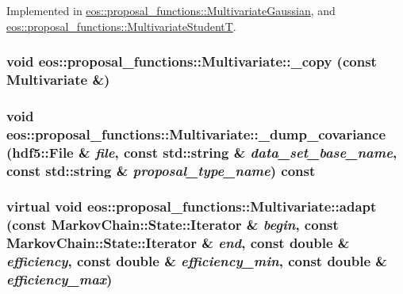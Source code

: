 Implemented in \hyperlink{classeos_1_1proposal__functions_1_1MultivariateGaussian_ac797f04a7bce3b029cfc32af0d6ecd07}{eos::proposal\_\-functions::MultivariateGaussian}, and \hyperlink{classeos_1_1proposal__functions_1_1MultivariateStudentT_aa44fa5958d242f5aae93c0dfa4cb8d84}{eos::proposal\_\-functions::MultivariateStudentT}.\hypertarget{classeos_1_1proposal__functions_1_1Multivariate_a33c4b4ed443dc77bb376636636f11b88}{
\subsubsection[{\_\-copy}]{\setlength{\rightskip}{0pt plus 5cm}void eos::proposal\_\-functions::Multivariate::\_\-copy (const {\bf Multivariate} \&)}}
\label{classeos_1_1proposal__functions_1_1Multivariate_a33c4b4ed443dc77bb376636636f11b88}
\hypertarget{classeos_1_1proposal__functions_1_1Multivariate_a4b45f19e0d4da4ed2c519d8a1d504fd2}{
\subsubsection[{\_\-dump\_\-covariance}]{\setlength{\rightskip}{0pt plus 5cm}void eos::proposal\_\-functions::Multivariate::\_\-dump\_\-covariance ({\bf hdf5::File} \& {\em file}, \/  const std::string \& {\em data\_\-set\_\-base\_\-name}, \/  const std::string \& {\em proposal\_\-type\_\-name}) const}}
\label{classeos_1_1proposal__functions_1_1Multivariate_a4b45f19e0d4da4ed2c519d8a1d504fd2}
\hypertarget{classeos_1_1proposal__functions_1_1Multivariate_a03a15f539c8b7eeefb7e323d8c3cd15d}{
\subsubsection[{adapt}]{\setlength{\rightskip}{0pt plus 5cm}virtual void eos::proposal\_\-functions::Multivariate::adapt (const {\bf MarkovChain::State::Iterator} \& {\em begin}, \/  const {\bf MarkovChain::State::Iterator} \& {\em end}, \/  const double \& {\em efficiency}, \/  const double \& {\em efficiency\_\-min}, \/  const double \& {\em efficiency\_\-max})}}
